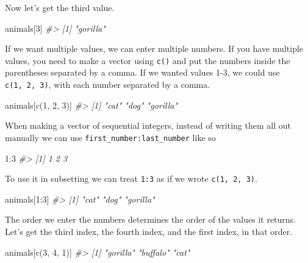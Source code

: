 \documentclass[
]{krantz}
\makeatletter
\newenvironment{Shaded}{\begin{snugshade}}{\end{snugshade}}
\newcommand{\CommentTok}[1]{\textcolor[rgb]{0.37,0.37,0.37}{\textit{#1}}}
\newcommand{\DecValTok}[1]{\textcolor[rgb]{0.06,0.06,0.06}{#1}}
\newcommand{\FunctionTok}[1]{\textcolor[rgb]{0,0,0}{#1}}
\newcommand{\NormalTok}[1]{#1}
\newcommand{\SpecialCharTok}[1]{\textcolor[rgb]{0,0,0}{#1}}
\newenvironment{kframe}{%
\medskip{}
\setlength{\fboxsep}{.8em}
 \def\at@end@of@kframe{}%
 \ifinner\ifhmode%
  \def\at@end@of@kframe{\end{minipage}}%
  \begin{minipage}{\columnwidth}%
 \fi\fi%
 \def\FrameCommand##1{\hskip\@totalleftmargin \hskip-\fboxsep
 \colorbox{shadecolor}{##1}\hskip-\fboxsep
     \hskip-\linewidth \hskip-\@totalleftmargin \hskip\columnwidth}%
 \MakeFramed {\advance\hsize-\width
   \@totalleftmargin\z@ \linewidth\hsize
   \@setminipage}}%
 {\par\unskip\endMakeFramed%
 \at@end@of@kframe}
\renewenvironment{Shaded}{\begin{kframe}}{\end{kframe}}
\makeatother
\begin{document}
Now let's get the third value.

\begin{Shaded}
\begin{Highlighting}[]
\NormalTok{animals[}\DecValTok{3}\NormalTok{]}
\CommentTok{\#\textgreater{} [1] "gorilla"}
\end{Highlighting}
\end{Shaded}

If we want multiple values, we can enter multiple numbers. If you have multiple values, you need to make a vector using \texttt{c()} and put the numbers inside the parentheses separated by a comma. If we wanted values 1-3, we could use \texttt{c(1,\ 2,\ 3)}, with each number separated by a comma.

\begin{Shaded}
\begin{Highlighting}[]
\NormalTok{animals[}\FunctionTok{c}\NormalTok{(}\DecValTok{1}\NormalTok{, }\DecValTok{2}\NormalTok{, }\DecValTok{3}\NormalTok{)]}
\CommentTok{\#\textgreater{} [1] "cat"     "dog"     "gorilla"}
\end{Highlighting}
\end{Shaded}

When making a vector of sequential integers, instead of writing them all out manually we can use \texttt{first\_number:last\_number} like so

\begin{Shaded}
\begin{Highlighting}[]
\DecValTok{1}\SpecialCharTok{:}\DecValTok{3}
\CommentTok{\#\textgreater{} [1] 1 2 3}
\end{Highlighting}
\end{Shaded}

To use it in subsetting we can treat \texttt{1:3} as if we wrote \texttt{c(1,\ 2,\ 3)}.

\begin{Shaded}
\begin{Highlighting}[]
\NormalTok{animals[}\DecValTok{1}\SpecialCharTok{:}\DecValTok{3}\NormalTok{]}
\CommentTok{\#\textgreater{} [1] "cat"     "dog"     "gorilla"}
\end{Highlighting}
\end{Shaded}

The order we enter the numbers determines the order of the values it returns. Let's get the third index, the fourth index, and the first index, in that order.

\begin{Shaded}
\begin{Highlighting}[]
\NormalTok{animals[}\FunctionTok{c}\NormalTok{(}\DecValTok{3}\NormalTok{, }\DecValTok{4}\NormalTok{, }\DecValTok{1}\NormalTok{)]}
\CommentTok{\#\textgreater{} [1] "gorilla" "buffalo" "cat"}
\end{Highlighting}
\end{Shaded}
\end{document}
